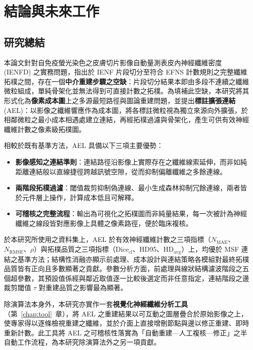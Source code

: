 
\chapter{結論與未來工作}
\label{chap:conclusion}

\section{研究總結}
\label{sec:summary}

本論文針對自免疫螢光染色之皮膚切片影像自動量測表皮內神經纖維密度 (IENFD) 之實務問題，指出於 IENF 片段切分至符合 EFNS 計數規則之完整纖維拓樸之間，存在一個\textbf{中介重建步驟之空缺}：片段切分結果本即由多段不連續之纖維微粒組成，單純骨架化並無法得到可直接計數之拓樸。為填補此空缺，本研究將其形式化為\textbf{像素成本圖}上之多源最短路徑與圖論重建問題，並提出\textbf{標註擴張連結} (AEL)：以影像之纖維響應作為成本圖，將各標註微粒視為獨立來源向外擴張，於相鄰微粒之最小成本相遇處建立連結，再經拓樸過濾與骨架化，產生可供有效神經纖維計數之像素級拓樸圖。

相較於既有基準方法，AEL 具備以下三項主要優勢：

\begin{itemize}
  \item \textbf{影像感知之連結準則}：連結路徑沿影像上實際存在之纖維線索延伸，而非如純距離連結般以直線捷徑跨越訊號空隙，從而抑制偏離纖維之多餘連線。
  \item \textbf{兩階段拓樸過濾}：閾值裁剪抑制偽連線、最小生成森林抑制冗餘連線，兩者皆於元件層上操作，計算成本低且可解釋。
  \item \textbf{可稽核之完整流程}：輸出為可視化之拓樸圖而非純量結果，每一次被計為神經纖維之線段皆對應影像上具體之像素路徑，便於臨床複核。
\end{itemize}

於本研究所使用之資料集上，AEL 於有效神經纖維計數之三項指標（$N_{\text{MAE}}$、$N_{\text{RMSE}}$、$\rho$）與拓樸品質之三項指標（$\text{Dice}_{\text{cl}}$、HD95、$\text{HD}_{\text{avg}}$）上，均優於 MSF 連結之基準方法；結構性消融亦顯示前處理、成本設計與連結策略各模組對最終拓樸品質皆有正向且多數顯著之貢獻。參數分析方面，前處理與線狀結構濾波階段之五個超參數，其預設值係經與鄰近取值逐一比較後選定而非任意指定，連結階段之邊裁剪閾值 $\tau$ 對重建品質之影響最為顯著。

除演算法本身外，本研究亦實作一套\textbf{視覺化神經纖維分析工具}（第~\ref{chap:tool}~章），將 AEL 之重建結果以可互動之圖層疊合於原始影像之上，使專家得以逐條檢視重建之纖維，並於介面上直接增刪節點與邊以修正重建、即時重新計數。此工具將 AEL 之可稽核性落實為「自動重建—人工複核—修正」之半自動工作流程，為本研究除演算法外之另一項貢獻。

